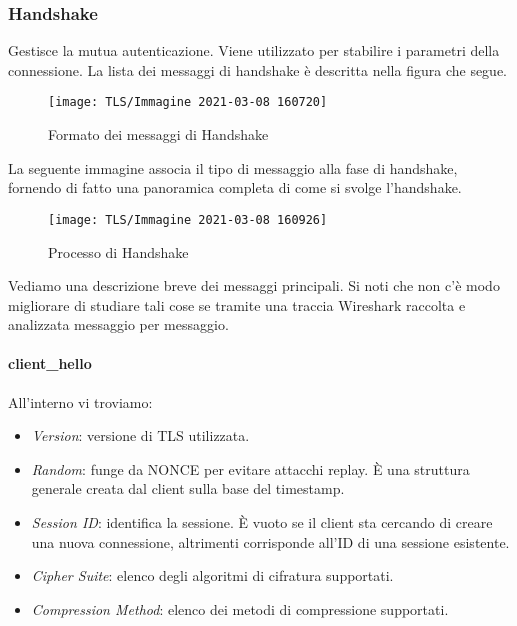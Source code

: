\documentclass[14pt]{extreport}
\begin{document}
\subsubsection{Handshake}

Gestisce la mutua autenticazione. Viene utilizzato per stabilire i parametri della connessione. La lista dei messaggi di handshake è descritta nella figura che segue.




\begin{figure}[H]
    \centering
    \texttt{[image: TLS/Immagine 2021-03-08 160720]}
    \caption{Formato dei messaggi di Handshake}
\end{figure}


La seguente immagine associa il tipo di messaggio alla fase di handshake, fornendo di fatto una panoramica completa di come si svolge l'handshake.






\begin{figure}[H]
    \centering
    \texttt{[image: TLS/Immagine 2021-03-08 160926]}
    \caption{Processo di Handshake}
\end{figure}

Vediamo una descrizione breve dei messaggi principali. Si noti che non c'è modo migliorare di studiare tali cose se tramite una traccia Wireshark raccolta e analizzata messaggio per messaggio.

\paragraph{client\_hello}
All'interno vi troviamo:


\begin{itemize}


    \item \textit{Version}: versione di TLS utilizzata.
    \item \textit{Random}: funge da NONCE per evitare attacchi replay. È una struttura generale creata dal client sulla base del timestamp.
    
    
    \item \textit{Session ID}: identifica la sessione. È vuoto se il client sta cercando di creare una nuova connessione, altrimenti corrisponde all'ID di una sessione esistente.
    
    
    \item \textit{Cipher Suite}: elenco degli algoritmi di cifratura supportati.
    
    \item \textit{Compression Method}: elenco dei metodi di compressione supportati.
\end{itemize}
\end{document}
